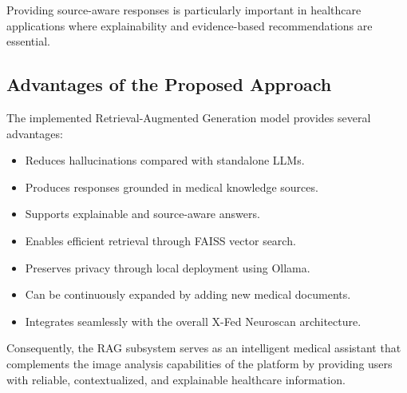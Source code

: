 Providing source-aware responses is particularly important in healthcare applications where explainability and evidence-based recommendations are essential.

\subsection{Advantages of the Proposed Approach}

The implemented Retrieval-Augmented Generation model provides several advantages:

\begin{itemize}
	\item Reduces hallucinations compared with standalone LLMs.
	\item Produces responses grounded in medical knowledge sources.
	\item Supports explainable and source-aware answers.
	\item Enables efficient retrieval through FAISS vector search.
	\item Preserves privacy through local deployment using Ollama.
	\item Can be continuously expanded by adding new medical documents.
	\item Integrates seamlessly with the overall X-Fed Neuroscan architecture.
\end{itemize}

Consequently, the RAG subsystem serves as an intelligent medical assistant that complements the image analysis capabilities of the platform by providing users with reliable, contextualized, and explainable healthcare information.
